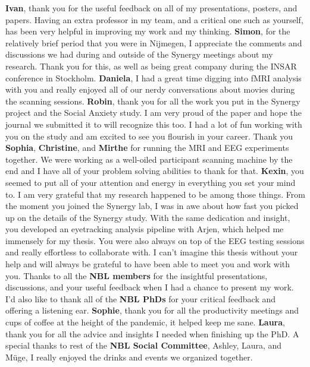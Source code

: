 \textbf{Ivan}, thank you for the useful feedback on all of my presentations, posters, and papers. Having an extra professor in my team, and a critical one such as yourself, has been very helpful in improving my work and my thinking. \newline
\textbf{Simon}, for the relatively brief period that you were in Nijmegen, I appreciate the comments and discussions we had during and outside of the Synergy meetings about my research. Thank you for this, as well as being great company during the INSAR conference in Stockholm. \newline
\textbf{Daniela}, I had a great time digging into fMRI analysis with you and really enjoyed all of our nerdy conversations about movies during the scanning sessions. \newline
\textbf{Robin}, thank you for all the work you put in the Synergy project and the Social Anxiety study. I am very proud of the paper and hope the journal we submitted it to will recognize this too. I had a lot of fun working with you on the study and am excited to see you flourish in your career. \newline
Thank you \textbf{Sophia}, \textbf{Christine}, and \textbf{Mirthe} for running the MRI and EEG experiments together. We were working as a well-oiled participant scanning machine by the end and I have all of your problem solving abilities to thank for that. \newline
\textbf{Kexin}, you seemed to put all of your attention and energy in everything you set your mind to. I am very grateful that my research happened to be among those things. From the moment you joined the Synergy lab, I was in awe about how fast you picked up on the details of the Synergy study. With the same dedication and insight, you developed an eyetracking analysis pipeline with Arjen, which helped me immensely for my thesis. You were also always on top of the EEG testing sessions and really effortless to collaborate with. I can't imagine this thesis without your help and will always be grateful to have been able to meet you and work with you. \newline
Thanks to all the \textbf{NBL members} for the insightful presentations, discussions, and your useful feedback when I had a chance to present my work. I'd also like to thank all of the \textbf{NBL PhDs} for your critical feedback and offering a listening ear. \textbf{Sophie}, thank you for all the productivity meetings and cups of coffee at the height of the pandemic, it helped keep me sane. \textbf{Laura}, thank you for all the advice and insights I needed when finishing up the PhD. A special thanks to rest of the \textbf{NBL Social Committee}, Ashley, Laura, and M\"{u}ge, I really enjoyed the drinks and events we organized together. \newline
